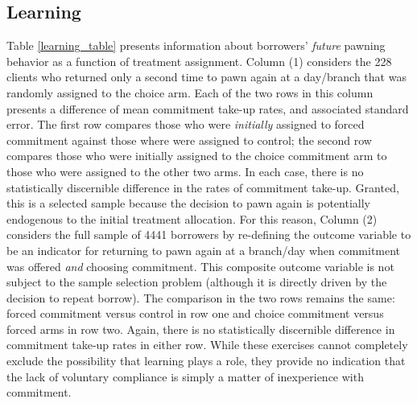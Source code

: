 \subsection{Learning}
\normalsize
Table \ref{learning_table} presents information about borrowers' \emph{future} pawning behavior as a function of treatment assignment. Column (1) considers the 228 clients who returned only a second time to pawn again at a day/branch that was randomly assigned to the choice arm. Each of the two rows in this column presents a difference of mean commitment take-up rates, and associated standard error. The first row compares those who were \emph{initially} assigned to forced commitment against those where were assigned to control; the second row compares those who were initially assigned to the choice commitment arm to those who were assigned to the other two arms. In each case, there is no statistically discernible difference in the rates of commitment take-up. Granted, this is a selected sample because the decision to pawn again is potentially endogenous to the initial treatment allocation. For this reason, Column (2) considers the full sample of 4441 borrowers by re-defining the outcome variable to be an indicator for returning to pawn again at a branch/day when commitment was offered \emph{and} choosing commitment. This composite outcome variable is not subject to the sample selection problem (although it is directly driven by the decision to repeat borrow). The comparison in the two rows remains the same: forced commitment versus control in row one and choice commitment versus forced arms in row two. Again, there is no statistically discernible difference in commitment take-up rates in either row. While these exercises cannot completely exclude the possibility that learning plays a role, they provide no indication that the lack of voluntary compliance is simply a matter of inexperience with commitment.





